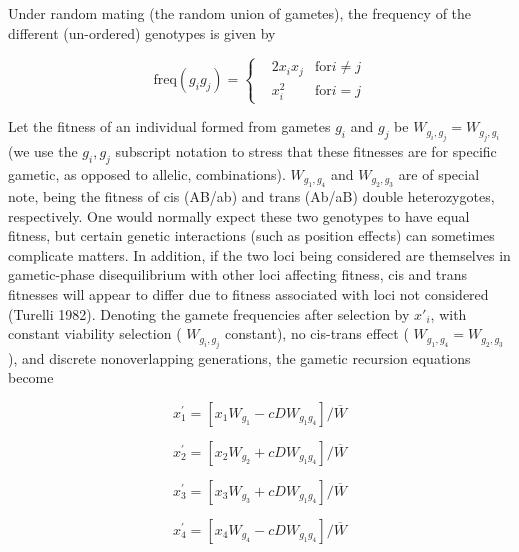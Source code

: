 \documentclass{article}
\begin{document}
Under random mating (the random union of gametes), the frequency of the different (un-ordered) genotypes is given by

\begin{equation}
\mathrm{freq}(g_{i}g_{j})=\left\{\begin{aligned}&2x_{i}x_{j}&\text{for}i\neq j\\ &x_{i}^{2}&\text{for}i=j\end{aligned}\right.
\end{equation}

Let the fitness of an individual formed from gametes  $ g_i $ and  $ g_j $ be  $ W_{g_i,g_j} = W_{g_j,g_i} $ (we use the  $ g_i,g_j $ subscript notation to stress that these fitnesses are for specific gametic, as opposed to allelic, combinations).  $ W_{g_1,g_4} $ and  $ W_{g_2,g_3} $ are of special note, being the fitness of cis (AB/ab) and trans (Ab/aB) double heterozygotes, respectively. One would normally expect these two genotypes to have equal fitness, but certain genetic interactions (such as position effects) can sometimes complicate matters. In addition, if the two loci being considered are themselves in gametic-phase disequilibrium with other loci affecting fitness, cis and trans fitnesses will appear to differ due to fitness associated with loci not considered (Turelli 1982). Denoting the gamete frequencies after selection by  $ x'_i $, with constant viability selection ( $ W_{g_i,g_j} $ constant), no cis-trans effect ( $ W_{g_1,g_4} = W_{g_2,g_3} $), and discrete nonoverlapping generations, the gametic recursion equations become

\begin{equation}
x_{1}^{\prime}=\left[x_{1}W_{g_{1}}-c D W_{g_{1}g_{4}}\right]/\overline{W}
\tag{5.13a}
\label{eq:5_13a}
\end{equation}

\begin{equation}
x_{2}^{\prime}=[x_{2}W_{g_{2}}+c D W_{g_{1}g_{4}}]/{\overline{{W}}}
\tag{5.13b}
\label{eq:5_13b}
\end{equation}

\begin{equation}
x_{3}^{\prime}=[x_{3}W_{g_{3}}+c D W_{g_{1}g_{4}}]/{\overline{{W}}}
\tag{5.13c}
\label{eq:5_13c}
\end{equation}

\begin{equation}
x_{4}^{\prime}=\left[x_{4}W_{g_{4}}-c D W_{g_{1}g_{4}}\right]/\overline{W}
\tag{5.13d}
\label{eq:5_13d}
\end{equation}
\end{document}
